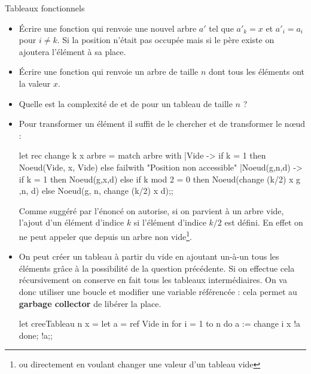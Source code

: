\begin{exo}{Tableaux fonctionnels}{}
\begin{itemize}
\item Écrire une fonction  qui renvoie une nouvel arbre $a'$ tel que $a'_k =x$ et $a'_i = a_i$ pour $i\ne k$. Si la position n'était pas occupée mais si le père existe on ajoutera l'élément à sa place.

\item Écrire une fonction  qui renvoie un arbre de taille $n$ dont tous les éléments ont la valeur $x$.

\item Quelle est la complexité de  et de  pour un tableau de taille $n$ ?

\end{itemize}
\reponse
\begin{itemize}
\item Pour transformer un élément il suffit de le chercher et de transformer le nœud :

\begin{ocaml}
let rec change k x arbre = 
  match arbre with
  |Vide -> if k = 1
           then Noeud(Vide, x, Vide)
           else failwith "Position non accessible"
  |Noeud(g,n,d) -> if k = 1
                   then Noeud(g,x,d)
                   else if k mod 2 = 0
                        then Noeud(change (k/2) x g ,n, d)
                        else Noeud(g, n, change (k/2) x d);;
\end{ocaml}
Comme suggéré par l'énoncé on autorise, si on parvient à un arbre vide, l'ajout d'un élément d'indice $k$ si l'élément d'indice $k/2$ est défini. En effet on ne peut appeler  que depuis un arbre non vide\footnote{ou directement en voulant changer une valeur d'un tableau vide}.

\item On peut créer un tableau à partir du vide en ajoutant un-à-un tous les éléments grâce à la possibilité de la question précédente. Si on effectue cela récursivement on conserve en fait tous les tableaux intermédiaires. On va donc utiliser une boucle et modifier une variable référencée : cela permet au {\bf garbage collector} de libérer la place. 

\begin{ocaml}
let creeTableau n x =
  let a = ref Vide in
  for i = 1 to n do a := change i x !a done;
  !a;;
\end{ocaml}


\end{itemize}
\end{exo}
